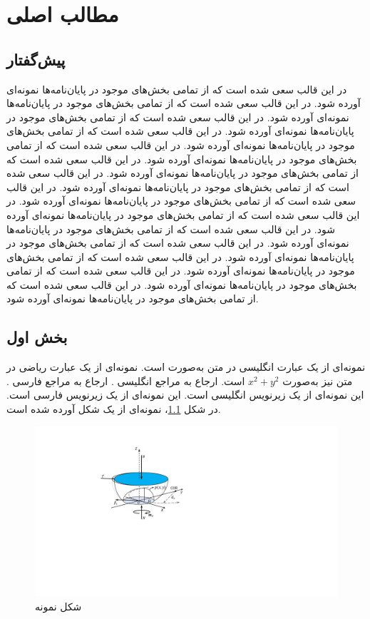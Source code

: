 \chapter{مطالب اصلی}
\section{پیش‌گفتار}
در این قالب سعی شده است که از تمامی بخش‌های موجود در پایان‌نامه‌ها نمونه‌ای آورده شود. در این قالب سعی شده است که از تمامی بخش‌های موجود در پایان‌نامه‌ها نمونه‌ای آورده شود. در این قالب سعی شده است که از تمامی بخش‌های موجود در پایان‌نامه‌ها نمونه‌ای آورده شود. در این قالب سعی شده است که از تمامی بخش‌های موجود در پایان‌نامه‌ها نمونه‌ای آورده شود. در این قالب سعی شده است که از تمامی بخش‌های موجود در پایان‌نامه‌ها نمونه‌ای آورده شود. در این قالب سعی شده است که از تمامی بخش‌های موجود در پایان‌نامه‌ها نمونه‌ای آورده شود. در این قالب سعی شده است که از تمامی بخش‌های موجود در پایان‌نامه‌ها نمونه‌ای آورده شود. در این قالب سعی شده است که از تمامی بخش‌های موجود در پایان‌نامه‌ها نمونه‌ای آورده شود. در این قالب سعی شده است که از تمامی بخش‌های موجود در پایان‌نامه‌ها نمونه‌ای آورده شود. در این قالب سعی شده است که از تمامی بخش‌های موجود در پایان‌نامه‌ها نمونه‌ای آورده شود. در این قالب سعی شده است که از تمامی بخش‌های موجود در پایان‌نامه‌ها نمونه‌ای آورده شود. در این قالب سعی شده است که از تمامی بخش‌های موجود در پایان‌نامه‌ها نمونه‌ای آورده شود. در این قالب سعی شده است که از تمامی بخش‌های موجود در پایان‌نامه‌ها نمونه‌ای آورده شود. در این قالب سعی شده است که از تمامی بخش‌های موجود در پایان‌نامه‌ها نمونه‌ای آورده شود.
\section{بخش اول}
نمونه‌ای از یک عبارت انگلیسی در متن به‌صورت
است. نمونه‌ای از یک عبارت ریاضی در متن نیز به‌صورت
$x^2 + y^2$
است. ارجاع به مراجع انگلیسی
\cite{Fakhari2015a,Lewis2003}.
ارجاع به مراجع فارسی
\cite{Fakhari2015b,HadianThesis2008}.
این نمونه‌ای از یک زیرنویس انگلیسی%
است. این نمونه‌ای از یک زیرنویس فارسی%
است. در شکل
\ref{Fig:SampleFigure1_2}،
نمونه‌ای از یک شکل آورده شده است. 

\begin{figure}[!htb]
\centering
\includegraphics[scale=1]{Figures/SampleFigure.pdf}
\caption{شکل نمونه}
\label{Fig:SampleFigure1_2}
\end{figure}


